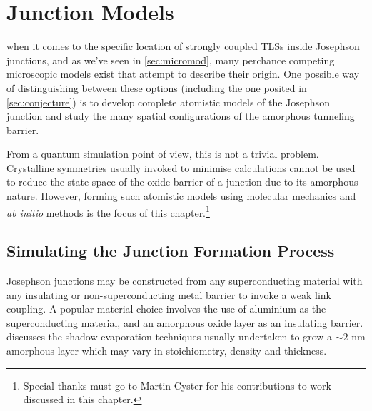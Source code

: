 \chapter{Junction Models}\label{ch:junctions}

 when it comes to the specific location of strongly coupled TLSs inside Josephson junctions, and as we've seen in \cref{sec:micromod}, many perchance competing microscopic models exist that attempt to describe their origin.
One possible way of distinguishing between these options (including the one posited in \cref{sec:conjecture}) is to develop complete atomistic models of the Josephson junction and study the many spatial configurations of the amorphous tunneling barrier.

From a quantum simulation point of view, this is not a trivial problem.
Crystalline symmetries usually invoked to minimise calculations cannot be used to reduce the state space of the oxide barrier of a junction due to its amorphous nature.
However, forming such atomistic models using molecular mechanics and \textit{ab initio} methods is the focus of this chapter.\footnote{Special thanks must go to Martin Cyster for his contributions to work discussed in this chapter.}

\section{Simulating the Junction Formation Process}

Josephson junctions may be constructed from any superconducting material with any insulating or non-superconducting metal barrier to invoke a weak link coupling.
A popular material choice involves the use of aluminium as the superconducting material, and an amorphous oxide layer as an insulating barrier.
 discusses the shadow evaporation techniques usually undertaken to grow a $\sim2$ nm amorphous layer which may vary in stoichiometry, density and thickness.

